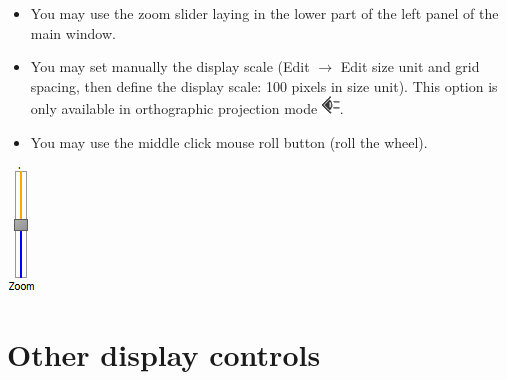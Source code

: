 \begin{minipage}{0.7\textwidth}
\begin{itemize}
\item You may use the zoom slider laying in the lower part of the left panel of the main window.
\item	You may set manually the display scale (Edit $\rightarrow$  Edit size unit and grid spacing, then define the display scale: 100 pixels in size unit). This option is only available in orthographic projection mode \includegraphics[scale=0.7]{images/06/camera/camera_ortho.png}.
\item	You may use the middle click mouse roll button (roll the wheel).
\end{itemize}
\end{minipage}    
\begin{minipage}{0.25\textwidth}\centering
  \includegraphics[scale=0.7]{images/06/camera/zoom_slider.png}


 \end{minipage}    




\section{Other display controls}



